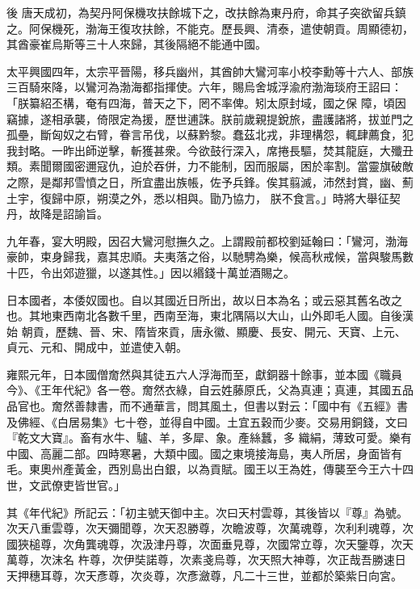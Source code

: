 \begin{pinyinscope}
 後
 唐天成初，為契丹阿保機攻扶餘城下之，改扶餘為東丹府，命其子突欲留兵鎮之。阿保機死，渤海王復攻扶餘，不能克。歷長興、清泰，遣使朝貢。周顯德初，其酋豪崔烏斯等三十人來歸，其後隔絕不能通中國。



 太平興國四年，太宗平晉陽，移兵幽州，其酋帥大鸞河率小校李勳等十六人、部族三百騎來降，以鸞河為渤海都指揮使。六年，賜烏舍城浮渝府渤海琰府王詔曰：「朕纂紹丕構，奄有四海，普天之下，罔不率俾。矧太原封域，國之保
 障，頃因竊據，遂相承襲，倚限定為援，歷世逋誅。朕前歲親提銳旅，盡護諸將，拔並門之孤壘，斷匈奴之右臂，眷言吊伐，以蘇黔黎。蠢茲北戎，非理構怨，輒肆薦食，犯我封略。一昨出師逆擊，斬獲甚衆。今欲鼓行深入，席捲長驅，焚其龍庭，大殲丑類。素聞爾國密邇寇仇，迫於吞併，力不能制，因而服屬，困於率割。當靈旗破敵之際，是鄰邦雪憤之日，所宜盡出族帳，佐予兵鋒。俟其翦滅，沛然封賞，幽、薊土宇，復歸中原，朔漠之外，悉以相與。勖乃協力，
 朕不食言。」時將大舉征契丹，故降是詔諭旨。



 九年春，宴大明殿，因召大鸞河慰撫久之。上謂殿前都校劉延翰曰：「鸞河，渤海豪帥，束身歸我，嘉其忠順。夫夷落之俗，以馳騁為樂，候高秋戒候，當與駿馬數十匹，令出郊遊獵，以遂其性。」因以緡錢十萬並酒賜之。



 日本國者，本倭奴國也。自以其國近日所出，故以日本為名；或云惡其舊名改之也。其地東西南北各數千里，西南至海，東北隅隔以大山，山外即毛人國。自後漢始
 朝貢，歷魏、晉、宋、隋皆來貢，唐永徽、顯慶、長安、開元、天寶、上元、貞元、元和、開成中，並遣使入朝。



 雍熙元年，日本國僧奝然與其徒五六人浮海而至，獻銅器十餘事，並本國《職員今》、《王年代紀》各一卷。奝然衣綠，自云姓藤原氏，父為真連；真連，其國五品品官也。奝然善隸書，而不通華言，問其風土，但書以對云：「國中有《五經》書及佛經、《白居易集》七十卷，並得自中國。土宜五穀而少麥。交易用銅錢，文曰『乾文大寶』。畜有水牛、驢、羊，多犀、象。產絲蠶，多
 織絹，薄致可愛。樂有中國、高麗二部。四時寒暑，大類中國。國之東境接海島，夷人所居，身面皆有毛。東奧州產黃金，西別島出白銀，以為貢賦。國王以王為姓，傳襲至今王六十四世，文武僚吏皆世官。」



 其《年代紀》所記云：「初主號天御中主。次曰天村雲尊，其後皆以『尊』為號。次天八重雲尊，次天彌聞尊，次天忍勝尊，次瞻波尊，次萬魂尊，次利利魂尊，次國狹槌尊，次角龔魂尊，次汲津丹尊，次面垂見尊，次國常立尊，次天鑒尊，次天萬尊，次沫名
 杵尊，次伊奘諾尊，次素戔烏尊，次天照大神尊，次正哉吾勝速日天押穗耳尊，次天彥尊，次炎尊，次彥瀲尊，凡二十三世，並都於築紫日向宮。




\end{pinyinscope}
